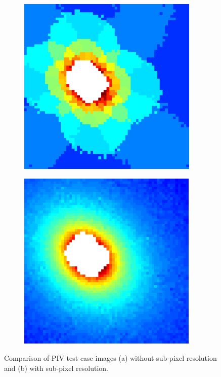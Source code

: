 \documentclass[letterpaper,12pt]{article}
\begin{document}
\begin{figure}[h]
    \centering
    \begin{subfigure}[b]{0.35\textwidth}
    	\centering
        \includegraphics[width=0.95\textwidth]{Sub_Pixel_No_PIV.PNG}
        \caption{}
        \label{fig:Sub_Pixel_No_PIV}
    \end{subfigure}
    \begin{subfigure}[b]{0.35\textwidth}
    	\centering
        \includegraphics[width=0.95\textwidth]{Sub_Pixel_Yes_PIV.PNG}
        \caption{}
        \label{fig:Sub_Pixel_Yes_PIV}
    \end{subfigure}

    \caption{Comparison of PIV test case images (a) without sub-pixel resolution and (b) with sub-pixel resolution.}
    \label{fig:Sub_Pixel_Resolution}
\end{figure}
\end{document}
